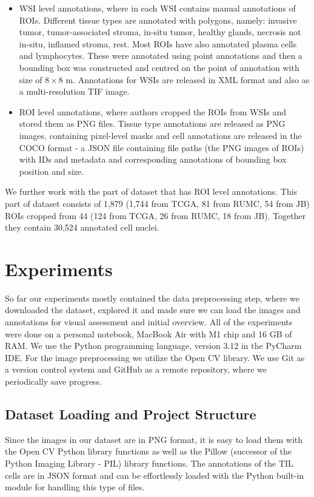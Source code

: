 \begin{itemize}
    \item WSI level annotations, where in each WSI contains manual annotations of ROIs. Different tissue types are annotated with polygons, namely: invasive tumor, tumor-associated stroma, in-situ tumor, healthy glands, necrosis not in-situ, inflamed stroma, rest. Most ROIs have also annotated plasma cells and lymphocytes. These were annotated using point annotations and then a bounding box was constructed and centred on the point of annotation with size of $8\!\times\!8$ \textmu m. Annotations for WSIs are released in XML format and also as a multi-resolution TIF image.
    \item ROI level annotations, where authors cropped the ROIs from WSIs and stored them as PNG files. Tissue type annotations are released as PNG images, containing pixel-level masks and cell annotations are released in the COCO format - a JSON file containing file paths (the PNG images of ROIs) with IDs and metadata and corresponding annotations of bounding box position and size.
\end{itemize}

We further work with the part of dataset that has ROI level annotations. This part of dataset consists of 1,879 (1,744 from TCGA, 81 from RUMC, 54 from JB) ROIs cropped from 44 (124 from TCGA, 26 from RUMC, 18 from JB). Together they contain 30,524 annotated cell nuclei.

\section{Experiments}
So far our experiments mostly contained the data preprocessing step, where we downloaded the dataset, explored it and made sure we can load the images and annotations for visual assessment and initial overview. All of the experiments were done on a personal notebook, MacBook Air with M1 chip and 16 GB of RAM. We use the Python programming language, version 3.12 in the PyCharm IDE. For the image preprocessing we utilize the Open CV library. We use Git as a version control system and GitHub as a remote repository, where we periodically save progress.

\subsection{Dataset Loading and Project Structure}
Since the images in our dataset are in PNG format, it is easy to load them with the Open CV Python library functions as well as the Pillow (successor of the Python Imaging Library - PIL) library functions. The annotations of the TIL cells are in JSON format and can be effortlessly loaded with the Python built-in module for handling this type of files.


